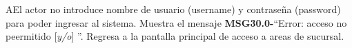 \begin{UCtrayectoriaA}{A}{El actor no introduce nombre de usuario (username) y contraseña (password) para poder ingresar al sistema.}
			\UCpaso Muestra el mensaje {\bf MSG30.0-}``Error: acceso no peermitido [{\em y/o}] ''.
			\UCpaso Regresa a la pantalla principal de acceso a areas de sucursal.
		\end{UCtrayectoriaA}

			

